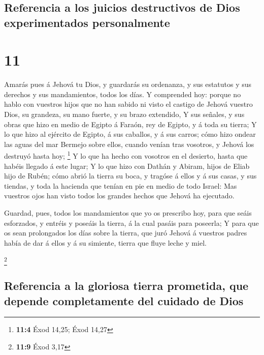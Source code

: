 \hypertarget{referencia-a-los-juicios-destructivos-de-dios-experimentados-personalmente}{%
\subsection{Referencia a los juicios destructivos de Dios experimentados
personalmente}\label{referencia-a-los-juicios-destructivos-de-dios-experimentados-personalmente}}

\hypertarget{section-10}{%
\section{11}\label{section-10}}

 Amarás pues á Jehová tu Dios, y guardarás su ordenanza, y
sus estatutos y sus derechos y sus mandamientos, todos los días.
 Y comprended hoy: porque no hablo con vuestros hijos que
no han sabido ni visto el castigo de Jehová vuestro Dios, su grandeza,
su mano fuerte, y su brazo extendido,  Y sus señales, y
sus obras que hizo en medio de Egipto á Faraón, rey de Egipto, y á toda
su tierra;  Y lo que hizo al ejército de Egipto, á sus
caballos, y á sus carros; cómo hizo ondear las aguas del mar Bermejo
sobre ellos, cuando venían tras vosotros, y Jehová los destruyó hasta
hoy; \footnote{\textbf{11:4} Éxod 14,25; Éxod 14,27}  Y lo
que ha hecho con vosotros en el desierto, hasta que habéis llegado á
este lugar;  Y lo que hizo con Dathán y Abiram, hijos de
Eliab hijo de Rubén; cómo abrió la tierra su boca, y tragóse á ellos y á
sus casas, y sus tiendas, y toda la hacienda que tenían en pie en medio
de todo Israel:  Mas vuestros ojos han visto todos los
grandes hechos que Jehová ha ejecutado.

 Guardad, pues, todos los mandamientos que yo os prescribo
hoy, para que seáis esforzados, y entréis y poseáis la tierra, á la cual
pasáis para poseerla;  Y para que os sean prolongados los
días sobre la tierra, que juró Jehová á vuestros padres había de dar á
ellos y á su simiente, tierra que fluye leche y miel.

\footnote{\textbf{11:9} Éxod 3,17}

\hypertarget{referencia-a-la-gloriosa-tierra-prometida-que-depende-completamente-del-cuidado-de-dios}{%
\subsection{Referencia a la gloriosa tierra prometida, que depende
completamente del cuidado de
Dios}\label{referencia-a-la-gloriosa-tierra-prometida-que-depende-completamente-del-cuidado-de-dios}}

